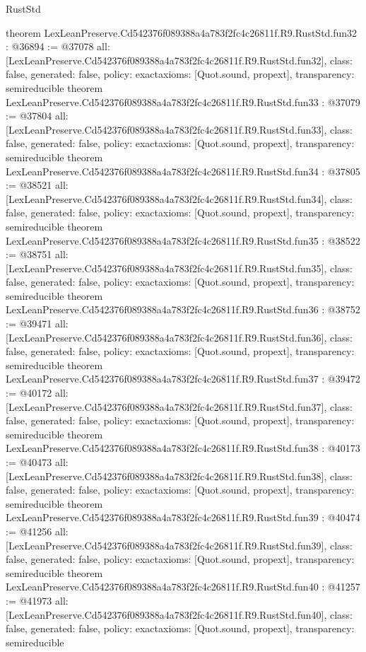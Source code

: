 \begin{lexlean}{RustStd}
\begin{coremodule}
{}
theorem LexLeanPreserve.Cd542376f089388a4a783f2fc4c26811f.R9.RustStd.fun32 : @36894 := @37078 {
  all: [LexLeanPreserve.Cd542376f089388a4a783f2fc4c26811f.R9.RustStd.fun32],
  class: false,
  generated: false,
  policy: exact{axioms: [Quot.sound, propext]},
  transparency: semireducible
}
theorem LexLeanPreserve.Cd542376f089388a4a783f2fc4c26811f.R9.RustStd.fun33 : @37079 := @37804 {
  all: [LexLeanPreserve.Cd542376f089388a4a783f2fc4c26811f.R9.RustStd.fun33],
  class: false,
  generated: false,
  policy: exact{axioms: [Quot.sound, propext]},
  transparency: semireducible
}
theorem LexLeanPreserve.Cd542376f089388a4a783f2fc4c26811f.R9.RustStd.fun34 : @37805 := @38521 {
  all: [LexLeanPreserve.Cd542376f089388a4a783f2fc4c26811f.R9.RustStd.fun34],
  class: false,
  generated: false,
  policy: exact{axioms: [Quot.sound, propext]},
  transparency: semireducible
}
theorem LexLeanPreserve.Cd542376f089388a4a783f2fc4c26811f.R9.RustStd.fun35 : @38522 := @38751 {
  all: [LexLeanPreserve.Cd542376f089388a4a783f2fc4c26811f.R9.RustStd.fun35],
  class: false,
  generated: false,
  policy: exact{axioms: [Quot.sound, propext]},
  transparency: semireducible
}
theorem LexLeanPreserve.Cd542376f089388a4a783f2fc4c26811f.R9.RustStd.fun36 : @38752 := @39471 {
  all: [LexLeanPreserve.Cd542376f089388a4a783f2fc4c26811f.R9.RustStd.fun36],
  class: false,
  generated: false,
  policy: exact{axioms: [Quot.sound, propext]},
  transparency: semireducible
}
theorem LexLeanPreserve.Cd542376f089388a4a783f2fc4c26811f.R9.RustStd.fun37 : @39472 := @40172 {
  all: [LexLeanPreserve.Cd542376f089388a4a783f2fc4c26811f.R9.RustStd.fun37],
  class: false,
  generated: false,
  policy: exact{axioms: [Quot.sound, propext]},
  transparency: semireducible
}
theorem LexLeanPreserve.Cd542376f089388a4a783f2fc4c26811f.R9.RustStd.fun38 : @40173 := @40473 {
  all: [LexLeanPreserve.Cd542376f089388a4a783f2fc4c26811f.R9.RustStd.fun38],
  class: false,
  generated: false,
  policy: exact{axioms: [Quot.sound, propext]},
  transparency: semireducible
}
theorem LexLeanPreserve.Cd542376f089388a4a783f2fc4c26811f.R9.RustStd.fun39 : @40474 := @41256 {
  all: [LexLeanPreserve.Cd542376f089388a4a783f2fc4c26811f.R9.RustStd.fun39],
  class: false,
  generated: false,
  policy: exact{axioms: [Quot.sound, propext]},
  transparency: semireducible
}
theorem LexLeanPreserve.Cd542376f089388a4a783f2fc4c26811f.R9.RustStd.fun40 : @41257 := @41973 {
  all: [LexLeanPreserve.Cd542376f089388a4a783f2fc4c26811f.R9.RustStd.fun40],
  class: false,
  generated: false,
  policy: exact{axioms: [Quot.sound, propext]},
  transparency: semireducible
}
\end{coremodule}
\end{lexlean}
